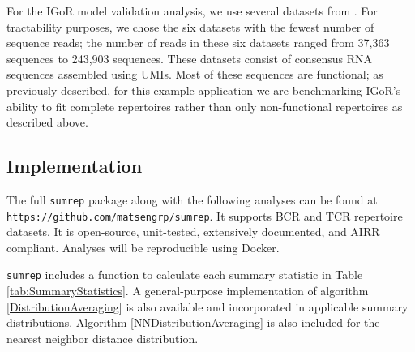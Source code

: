 \documentclass{article}
\begin{document}
For the IGoR model validation analysis, we use several datasets from \cite{Britanova2016-iw}.
For tractability purposes, we chose the six datasets with the fewest number of sequence reads; the number of reads in these six datasets ranged from 37,363 sequences to 243,903 sequences.
These datasets consist of consensus RNA sequences assembled using UMIs.
Most of these sequences are functional; as previously described, for this example application we are benchmarking IGoR's ability to fit complete repertoires rather than only non-functional repertoires as described above.


\subsection*{Implementation}
The full \texttt{sumrep} package along with the following analyses can be found at \texttt{https://github.com/matsengrp/sumrep}.
It supports BCR and TCR repertoire datasets.
It is open-source, unit-tested, extensively documented, and AIRR compliant.
Analyses will be reproducible using Docker.

\texttt{sumrep} includes a function to calculate each summary statistic in Table \ref{tab:SummaryStatistics}.
A general-purpose implementation of algorithm \ref{DistributionAveraging} is also available and incorporated in applicable summary distributions.
Algorithm \ref{NNDistributionAveraging} is also included for the nearest neighbor distance distribution.
\end{document}
